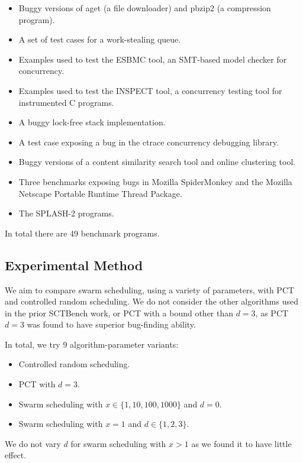 \begin{itemize}
\item Buggy versions of aget (a file downloader) and pbzip2 (a compression
program).
\item A set of test cases for a work-stealing queue.
\item Examples used to test the ESBMC tool\cite{cordeiro2011}, an SMT-based
model checker for concurrency.
\item Examples used to test the INSPECT tool\cite{yang2008}, a concurrency
testing tool for instrumented C programs.
\item A buggy lock-free stack implementation.
\item A test case exposing a bug in the ctrace\cite{mcpherson2003}
  concurrency debugging library.
\item Buggy versions of a content similarity search tool and online clustering
tool.
\item Three benchmarks exposing bugs in Mozilla
  SpiderMonkey\cite{eich1996} and the Mozilla Net\-scape Portable
  Runtime Thread Package\cite{mozilal1996}.
\item The SPLASH-2 programs\cite{woo1995}.
\end{itemize}

In total there are 49 benchmark programs.

\subsection{Experimental Method}
\label{sec:algorithms-eval-method}

We aim to compare swarm scheduling, using a variety of parameters, with PCT and
controlled random scheduling.  We do not consider the other algorithms used in
the prior SCTBench work, or PCT with a bound other than $d=3$, as PCT $d=3$ was
found to have superior bug-finding ability\cite{thomson2016}.

In total, we try 9 algorithm-parameter variants:

\begin{itemize}
\item Controlled random scheduling.
\item PCT with $d=3$.
\item Swarm scheduling with $x \in \{1,10,100,1000\}$ and $d=0$.
\item Swarm scheduling with $x=1$ and $d \in \{1,2,3\}$.
\end{itemize}

We do not vary $d$ for swarm scheduling with $x > 1$ as we found it to have
little effect.

